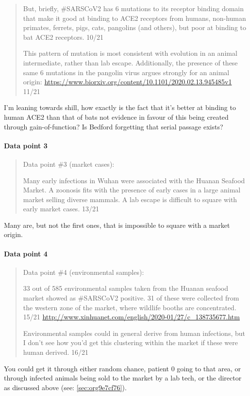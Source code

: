 \documentclass[11pt]{article}
\begin{document}
\begin{quote}
But, briefly, \#SARSCoV2 has 6 mutations to its receptor binding domain that make it good at binding to ACE2 receptors from humans, non-human primates, ferrets, pigs, cats, pangolins (and others), but poor at binding to bat ACE2 receptors. 10/21

This pattern of mutation is most consistent with evolution in an animal intermediate, rather than lab escape. Additionally, the presence of these same 6 mutations in the pangolin virus argues strongly for an animal origin: \url{https://www.biorxiv.org/content/10.1101/2020.02.13.945485v1} 11/21
\end{quote}
I'm leaning towards shill, how exactly is the fact that it's better at binding to human ACE2 than that of bats not evidence in favour of this being created through gain-of-function? Is Bedford forgetting that serial passage exists?

\paragraph{Data point 3}
\label{sec:org50f5e88}
\begin{quote}
Data point \#3 (market cases):

Many early infections in Wuhan were associated with the Huanan Seafood Market. A zoonosis fits with the presence of early cases in a large animal market selling diverse mammals. A lab escape is difficult to square with early market cases. 13/21
\end{quote}
Many are, but not the first ones, that is impossible to square with a market origin.

\paragraph{Data point 4}
\label{sec:org912ad3d}
\begin{quote}
Data point \#4 (environmental samples):

33 out of 585 environmental samples taken from the Huanan seafood market showed as \#SARSCoV2 positive. 31 of these were collected from the western zone of the market, where wildlife booths are concentrated. 15/21
\url{http://www.xinhuanet.com/english/2020-01/27/c\_138735677.htm}

Environmental samples could in general derive from human infections, but I don't see how you'd get this clustering within the market if these were human derived. 16/21
\end{quote}
You could get it through either random chance, patient 0 going to that area, or through infected animals being sold to the market by a lab tech, or the director as discussed above (see: \ref{sec:org9e7cf76}).
\end{document}
